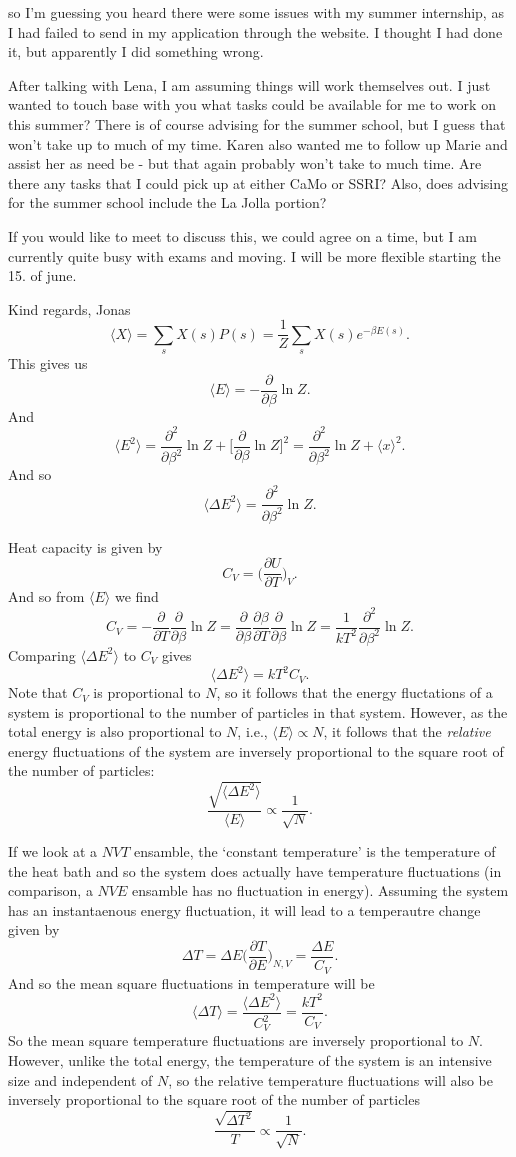 \documentclass[a4paper, 11pt, notitlepage, english]{article}
\newcommand{\p}{\partial}
\begin{document}
so I'm guessing you heard there were some issues with my summer internship, as I had failed to send in my application through the website. I thought I had done it, but apparently I did something wrong.

After talking with Lena, I am assuming things will work themselves out. I just wanted to touch base with you what tasks could be available for me to work on this summer? There is of course advising for the summer school, but I guess that won't take up to much of my time. Karen also wanted me to follow up Marie and assist her as need be - but that again probably won't take to much time. Are there any tasks that I could pick up at either CaMo or SSRI? Also, does advising for the summer school include the La Jolla portion? 

If you would like to meet to discuss this, we could agree on a time, but I am currently quite busy with exams and moving. I will be more flexible starting the 15. of june.

Kind regards,
Jonas
$$\langle X \rangle = \sum_s X(s) P(s) = \frac{1}{Z} \sum_s X(s) e^{-\beta E(s)}.$$
This gives us
$$\langle E \rangle = - \frac{\p }{\p \beta} \ln Z.$$
And 
$$\langle E^2 \rangle = \frac{\p^2}{\p \beta^2} \ln Z + \bigg[\frac{\p }{\p \beta}\ln Z \bigg]^2 = \frac{\p^2}{\p \beta^2} \ln Z  + \langle x \rangle^2.$$
And so
$$\langle \Delta E^2 \rangle = \frac{\p^2}{\p \beta^2} \ln Z.$$

Heat capacity is given by
$$C_V = \bigg(\frac{\p U}{\p T}\bigg)_V.$$
And so from $\langle E \rangle$ we find
$$C_V = -\frac{\p }{\p T} \frac{\p}{\p \beta} \ln Z = \frac{\p}{\p \beta} \frac{\p \beta}{\p T} \frac{\p}{\p \beta} \ln Z = \frac{1}{kT^2} \frac{\p^2}{\p \beta^2} \ln Z.$$
Comparing $\langle \Delta E^2 \rangle$ to $C_V$ gives
$$\langle \Delta E^2 \rangle = kT^2 C_V.$$
Note that $C_V$ is proportional to $N$, so it follows that the energy fluctations of a system is proportional to the number of particles in that system. However, as the total energy is also proportional to $N$, i.e., $\langle E \rangle \propto N$, it follows that the \emph{relative} energy fluctuations of the system are inversely proportional to the square root of the number of particles:
$$\frac{\sqrt{\langle \Delta E^2 \rangle}}{\langle E \rangle} \propto \frac{1}{\sqrt{N}}.$$

If we look at a $NVT$ ensamble, the `constant temperature' is the temperature of the heat bath and so the system does actually have temperature fluctuations (in comparison, a $NVE$ ensamble has no fluctuation in energy). Assuming the system has an instantaenous energy fluctuation, it will lead to a temperautre change given by
$$\Delta T  = \Delta E \bigg(\frac{\p T}{\p E}\bigg)_{N,V} = \frac{\Delta E}{C_V}.$$
And so the mean square fluctuations in temperature will be
$$\langle \Delta T \rangle = \frac{\langle \Delta E^2 \rangle}{C_V^2} = \frac{kT^2}{C_V}.$$
So the mean square temperature fluctuations are inversely proportional to $N$. However, unlike the total energy, the temperature of the system is an intensive size
and independent
of $N$,
 so the relative 
temperature fluctuations will also be inversely proportional to the square root of the number of particles
$$\frac{\sqrt{\Delta T^2}}{T} \propto \frac{1}{\sqrt{N}}.$$
\end{document}
